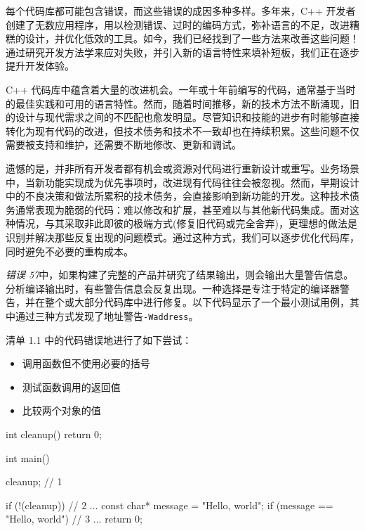 
每个代码库都可能包含错误，而这些错误的成因多种多样。多年来，C++ 开发者创建了无数应用程序，用以检测错误、过时的编码方式，弥补语言的不足，改进糟糕的设计，并优化低效的工具。如今，我们已经找到了一些方法来改善这些问题！通过研究开发方法学来应对失败，并引入新的语言特性来填补短板，我们正在逐步提升开发体验。

C++ 代码库中蕴含着大量的改进机会。一年或十年前编写的代码，通常基于当时的最佳实践和可用的语言特性。然而，随着时间推移，新的技术方法不断涌现，旧的设计与现代需求之间的不匹配也愈发明显。尽管知识和技能的进步有时能够直接转化为现有代码的改进，但技术债务和技术不一致却也在持续积累。这些问题不仅需要被支持和维护，还需要不断地修改、更新和调试。

遗憾的是，并非所有开发者都有机会或资源对代码进行重新设计或重写。业务场景中，当新功能实现成为优先事项时，改进现有代码往往会被忽视。然而，早期设计中的不良决策和做法所累积的技术债务，会直接影响到新功能的开发。这种技术债务通常表现为脆弱的代码：难以修改和扩展，甚至难以与其他新代码集成。面对这种情况，与其采取非此即彼的极端方式(修复旧代码或完全舍弃)，更理想的做法是识别并解决那些反复出现的问题模式。通过这种方式，我们可以逐步优化代码库，同时避免不必要的重构成本。


\textit{错误 57}中，如果构建了完整的产品并研究了结果输出，则会输出大量警告信息。分析编译输出时，有些警告信息会反复出现。一种选择是专注于特定的编译器警告，并在整个或大部分代码库中进行修复。以下代码显示了一个最小测试用例，其中通过三种方式发现了地址警告\texttt{-Waddress}。

清单 1.1 中的代码错误地进行了如下尝试：

\begin{itemize}
\item
调用函数但不使用必要的括号

\item
测试函数调用的返回值

\item
比较两个对象的值
\end{itemize}


\begin{cpp}
int cleanup() {
  return 0;
}

int main() {
  cleanup; // 1

  if (!(cleanup)) { // 2
    ...
  }
  const char* message = "Hello, world";
  if (message == "Hello, world") { // 3
    ...
  }
  return 0;
}
\end{cpp}

